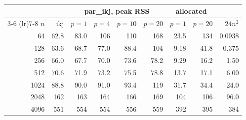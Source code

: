 \begin{tabular}{rrrrrrrrr}
\toprule
 & & \multicolumn{4}{c}{par\_ikj, peak RSS} & \multicolumn{2}{c}{allocated} & \\ \cmidrule(lr){3-6} \cmidrule(lr){7-8} $n$ & ikj & $p=1$ & $p=4$ & $p=10$ & $p=20$ & $p=1$ & $p=20$ & $24n^2$ \\
\midrule
64 & 62.8 & 83.0 & 106 & 110 & 168 & 23.5 & 134 & 0.0938 \\
128 & 63.6 & 68.7 & 77.0 & 88.4 & 104 & 9.18 & 41.8 & 0.375 \\
256 & 66.0 & 67.7 & 70.0 & 73.6 & 78.2 & 9.29 & 16.2 & 1.50 \\
512 & 70.6 & 71.9 & 73.2 & 75.5 & 78.8 & 13.7 & 17.1 & 6.00 \\
1024 & 88.8 & 90.0 & 91.0 & 93.4 & 119 & 31.7 & 34.4 & 24.0 \\
2048 & 162 & 163 & 164 & 166 & 169 & 104 & 106 & 96.0 \\
4096 & 551 & 554 & 554 & 556 & 559 & 392 & 395 & 384 \\
\bottomrule
\end{tabular}

